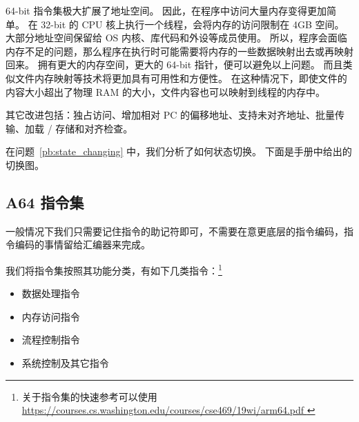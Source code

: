 64-bit 指令集极大扩展了地址空间。
因此，在程序中访问大量内存变得更加简单。
在 32-bit 的 CPU 核上执行一个线程，会将内存的访问限制在 4GB 空间。
大部分地址空间保留给 OS 内核、库代码和外设等成员使用。
所以，程序会面临内存不足的问题，那么程序在执行时可能需要将内存的一些数据映射出去或再映射回来。
拥有更大的内存空间，更大的 64-bit 指针，便可以避免以上问题。
而且类似文件内存映射等技术将更加具有可用性和方便性。
在这种情况下，即使文件的内容大小超出了物理 RAM 的大小，文件内容也可以映射到线程的内存中。

其它改进包括：独占访问、增加相对 PC 的偏移地址、支持未对齐地址、批量传输、加载 / 存储和对齐检查。

在问题~\ref{pb:state_changing} 中，我们分析了如何状态切换。
下面是手册中给出的切换图。


\subsection{A64 指令集}

一般情况下我们只需要记住指令的助记符即可，不需要在意更底层的指令编码，指令编码的事情留给汇编器来完成。

我们将指令集按照其功能分类，有如下几类指令：\footnote{
  关于指令集的快速参考可以使用 \url{
    https://courses.cs.washington.edu/courses/cse469/19wi/arm64.pdf
  }
}

\begin{itemize}
  \item 数据处理指令
  \item 内存访问指令
  \item 流程控制指令
  \item 系统控制及其它指令
\end{itemize}

